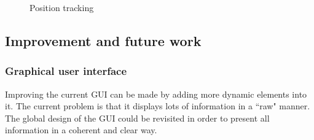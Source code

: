 \documentclass[11pt,a4paper]{article}
\begin{document}
\begin{figure}[ht]%
	\centering
    \qquad  
    \qquad  
    \qquad  
    \qquad  
    \caption{Position tracking}
    \label{fig:exp3b}
\end{figure}



\subsection{Improvement and future work}
\subsubsection{Graphical user interface}
Improving the current GUI can be made by adding more dynamic elements into it. The current 
problem is
that it displays lots of information in a ``raw" manner. The global design of the GUI could be 
revisited in
order to present all information  in a coherent and clear way.
\end{document}
